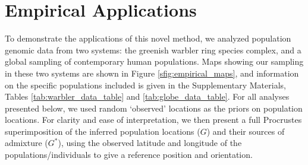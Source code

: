\documentclass[12pt]{article}
\newcommand{\identifyadmixsource}[1]{{#1^{*}}}
\newcommand{\gc}[1]{{\it\color{blue}{(#1)}}}
\begin{document}
\section*{Empirical Applications}
To demonstrate the applications of this novel method, we analyzed population genomic data from two systems: the greenish warbler ring species complex, and a global sampling of contemporary human populations.  Maps showing our sampling in these two systems are shown in Figure \ref{sfig:empirical_maps}, and information on the specific populations included is given in the Supplementary Materials, Tables \ref{tab:warbler_data_table} and \ref{tab:globe_data_table}.  
For all analyses presented below, we used random `observed' locations as the priors on population locations.
\gc{The geogenetic maps shown here were maximum a posteriori estimates (over all parameters).} For clarity and ease of interpretation, we then present a full Procrustes superimposition of the inferred population locations ($G$) and their sources of admixture ($\identifyadmixsource{G}$), using the observed latitude and longitude of the populations/individuals to give a reference position and orientation.
\end{document}
